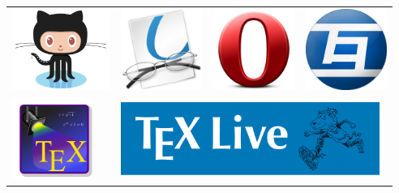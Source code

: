 \begin{tabular}{llll}
\includegraphics[height=100px]{img/thanks/octocat.png}
& \includegraphics[height=100px]{img/thanks/okular.png}
& \includegraphics[height=100px]{img/thanks/opera.png}
& \includegraphics[height=100px]{img/thanks/tagainijisho.png}\\

\includegraphics[height=100px]{img/thanks/texstudio.png}
& \multicolumn{3}{l}{\includegraphics[height=90px]{img/thanks/texlive.png}}\\

\end{tabular}

